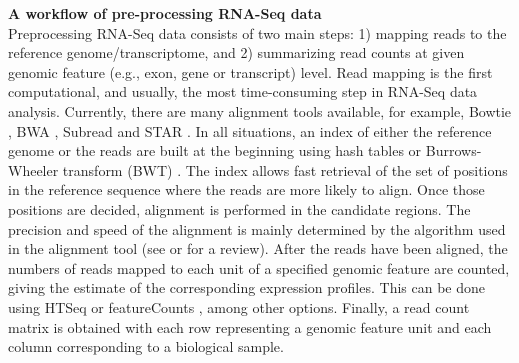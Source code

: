 \textbf{A workflow of pre-processing RNA-Seq data}\\
Preprocessing RNA-Seq data consists of two main steps: 1) mapping reads to the reference
genome/transcriptome, and 2) summarizing read counts at given genomic feature (e.g., exon, gene or
transcript) level. Read mapping is the first computational, and usually, the most time-consuming
step in RNA-Seq data analysis. Currently, there are many alignment tools available, for example,
Bowtie \citep{langmead2012fast,langmead2009ultrafast}, BWA \citep{li2013aligning,li2009fast},
Subread \citep{shi2013subread} and STAR \citep{dobin2013star}. In all situations, an index of either
the reference genome or the reads are built at the beginning using hash tables or Burrows-Wheeler
transform (BWT) \citep{burrows1994block}. The index allows fast retrieval of the set of positions in
the reference sequence where the reads are more likely to align. Once those positions are decided,
alignment is performed in the candidate regions. The precision and speed of the alignment is mainly
determined by the algorithm used in the alignment tool (see \citep{hatem2013benchmarking} or
\cite{li2010survey} for a review). After the reads have been aligned, the numbers of reads mapped to
each unit of a specified genomic feature are counted, giving the estimate of the corresponding
expression profiles. This can be done using HTSeq \cite{anders2010htseq} or featureCounts
\citep{liao2013featurecounts}, among other options. Finally, a read count matrix is
obtained with each row representing a genomic feature unit and each column corresponding to a biological
sample. 

